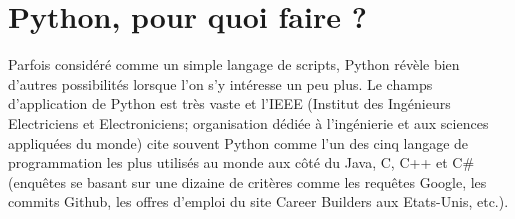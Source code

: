 \documentclass[12pt, a4paper]{article}
\begin{document}
\section{Python, pour quoi faire ?}
Parfois considéré comme un simple langage de scripts, Python révèle bien d'autres possibilités lorsque l'on s'y intéresse un peu plus. Le champs d'application de Python est très vaste et l'IEEE (Institut des Ingénieurs Electriciens et Electroniciens; organisation dédiée à l'ingénierie et aux sciences appliquées du monde) cite souvent Python comme l'un des cinq langage de programmation les plus utilisés au monde aux côté du Java, C, C++ et C\# (enquêtes se basant sur une dizaine de critères comme les requêtes Google, les commits Github, les offres d'emploi du site Career Builders aux Etats-Unis, etc.).
\end{document}
